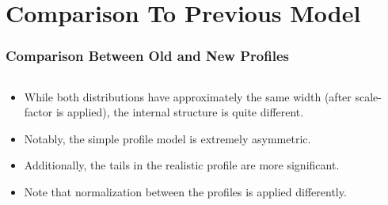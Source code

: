\section{Comparison To Previous Model}
\label{ch:AmareshComparison}

\begin{frame}
\frametitle{Comparison Between Old and New Profiles}

\begin{columns}[onlytextwidth]
  \begin{column}{0.5\textwidth}
    \begin{itemize}
			\item While both distributions have approximately the same width (after
      scale-factor is applied), the internal structure is quite different.
      \item Notably, the simple profile model is extremely asymmetric.
			\item Additionally, the tails in the realistic profile are more
				significant.
			\item Note that normalization between the profiles is applied
				differently.
    \end{itemize}
  \end{column}


\end{columns}
\end{frame}

